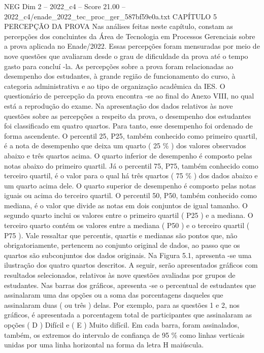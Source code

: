 \begin{textsample}{NEG Dim 2 – 2022\_c4 – Score 21.00 – 2022\_c4/enade\_2022\_tec\_proc\_ger\_587bf59e0a.txt}  \label{ex:f2_neg_414}
CAPÍTULO 5 PERCEPÇÃO DA PROVA Nas análises feitas neste capítulo, constam as percepções dos concluintes da Área de Tecnologia em Processos Gerenciais sobre a prova aplicada no Enade/2022.
Essas percepções foram mensuradas por meio de nove questões que avaliaram desde o grau de dificuldade da prova até o tempo gasto para concluí -la.
As percepções sobre a prova foram relacionadas ao desempenho dos estudantes, à grande região de funcionamento do curso, à categoria administrativa e ao tipo de organização acadêmica da IES.
O questionário de percepção da prova encontra -se ao final do Anexo VIII, no qual está a reprodução do exame.
Na apresentação dos dados relativos às nove questões sobre as percepções a respeito da prova, o desempenho dos estudantes foi classificado em quatro quartos.
Para tanto, esse desempenho foi ordenado de forma ascendente.
O percentil 25, P25, também conhecido como primeiro quartil, é a nota de desempenho que deixa um quarto ( 25 \% ) dos valores observados abaixo e três quartos acima.
O quarto inferior de desempenho é composto pelas notas abaixo do primeiro quartil.
Já o percentil 75, P75, também conhecido como terceiro quartil, é o valor para o qual há três quartos ( 75 \% ) dos dados abaixo e um quarto acima dele.
O quarto superior de desempenho é composto pelas notas iguais ou acima do terceiro quartil.
O percentil 50, P50, também conhecido como mediana, é o valor que divide as notas em dois conjuntos de igual tamanho.
O segundo quarto inclui os valores entre o primeiro quartil ( P25 ) e a mediana.
O terceiro quarto contém os valores entre a mediana ( P50 ) e o terceiro quartil ( P75 ).
Vale ressaltar que percentis, quartis e medianas são pontos que, não obrigatoriamente, pertencem ao conjunto original de dados, ao passo que os quartos são subconjuntos dos dados originais.
Na Figura 5.1, apresenta -se uma ilustração dos quatro quartos descritos.
A seguir, serão apresentados gráficos com resultados selecionados, relativos às nove questões avaliadas por grupos de estudantes.
Nas barras dos gráficos, apresenta -se o percentual de estudantes que assinalaram uma das opções ou a soma das porcentagens daqueles que assinalaram duas ( ou três ) delas.
Por exemplo, para as questões 1 e 2, nos gráficos, é apresentada a porcentagem total de participantes que assinalaram as opções ( D ) Difícil e ( E ) Muito difícil.
Em cada barra, foram assinalados, também, os extremos do intervalo de confiança de 95 \% como linhas verticais unidas por uma linha horizontal na forma da letra H maiúscula.

\end{textsample}
